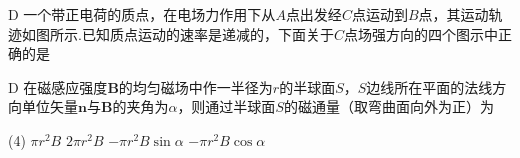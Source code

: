 \begin{choice}{D}{}
一个带正电荷的质点，在电场力作用下从$A$点出发经$C$点运动到$B$点，其运动轨迹如图所示.已知质点运动的速率是递减的，下面关于$C$点场强方向的四个图示中正确的是
\end{choice}
\vspace{5em}
  

\hspace{-2.16em}
\begin{minipage}{0.67\textwidth}
    \begin{choice}{D}{}
        在磁感应强度$\boldsymbol{B}$的均匀磁场中作一半径为$r$的半球面$S$，$S$边线所在平面的法线方向单位矢量$\boldsymbol{n}$与$\boldsymbol{B}$的夹角为$\alpha$，则通过半球面$S$的磁通量（取弯曲面向外为正）为
        \begin{tasks}(4)
        \task $\pi r^2B$
        \task $2\pi r^2B$
        \task $-\pi r^2B\sin\alpha$
        \task $-\pi r^2B\cos\alpha$
        \end{tasks}
    \end{choice}
\end{minipage}
\hfill
\begin{minipage}[c]{0.33\textwidth}
\begin{center}
\end{center}
\end{minipage}

